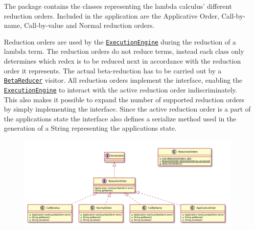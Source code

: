 The \texttt{} package contains the classes representing the lambda calculus' different reduction orders.
Included in the application are the Applicative Order, Call-by-name, Call-by-value and Normal reduction orders.

Reduction orders are used by the \texttt{\hyperref[type:edu.kit.wavelength.client.model]{ExecutionEngine}} during the reduction
of a lambda term.
The reduction orders do not reduce terms, instead each class only determines which redex is to be reduced next in accordance with the reduction order it represents.
The actual beta-reduction has to be carried out by a \texttt{\hyperref[type:edu.kit.wavelength.client.model.term.LambdaTerm]{BetaReducer}} visitor.
All reduction orders implement the \texttt{{}} interface, enabling the \texttt{\hyperref[type:edu.kit.wavelength.client.model.ExecutionEngine]{ExecutionEngine}} to interact with the active reduction order indiscriminately.
This also makes it possible to expand the number of supported reduction orders by simply implementing the interface.
Since the active reduction order is a part of the applications state the interface
also defines a serialize method used in the generation of a String representing the applications state.

\begin{figure}[H]
	\centering
	\includegraphics[width=\textwidth]{packageDiagrams/reductionPackage}
\end{figure}
